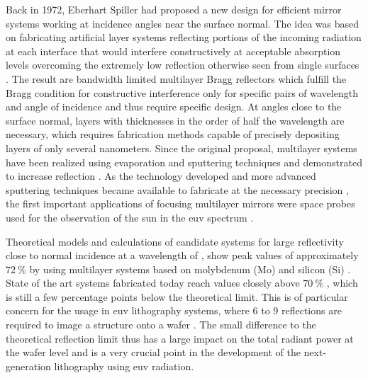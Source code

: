 Back in 1972, Eberhart Spiller had proposed a new design for efficient mirror systems working at incidence angles near the surface normal. The idea was based on fabricating artificial layer systems reflecting portions of the incoming radiation at each interface that would interfere constructively at acceptable absorption levels overcoming the extremely low reflection otherwise seen from single surfaces \cite{spiller_low-loss_1972}. The result are bandwidth limited multilayer Bragg reflectors which fulfill the Bragg condition for constructive interference only for specific pairs of wavelength and angle of incidence and thus require specific design. At angles close to the surface normal, layers with thicknesses in the order of half the wavelength are necessary, which requires fabrication methods capable of precisely depositing layers of only several nanometers. Since the original proposal, multilayer systems have been realized using evaporation and sputtering techniques and demonstrated to increase reflection \cite{spiller_reflective_1976, underwood_layered_1981}. As the technology developed and more advanced sputtering techniques became available to fabricate at the necessary precision \cite{stearns_fabrication_1991}, the first important applications of focusing multilayer mirrors were space probes used for the observation of the sun in the \gls{euv} spectrum \cite{chauvineau_description_1992, clette_eit:_1995, spiller_soft_1994}.

Theoretical models and calculations of candidate systems for large reflectivity close to normal incidence at a wavelength of , show peak values of approximately $\SI{72}{\percent}$ by using multilayer systems based on molybdenum (Mo) and silicon (Si) \cite{barbee_jr._multi-spectral_1991,finkenthal_near_1990, barbee_molybdenum-silicon_1985}. State of the art systems fabricated today reach values closely above $\SI{70}{\percent}$ \cite{martinez-galarce_high_2000,bajt_improved_2002,braun_grenzflachen-optimierte_2003, braun_mo/si_2002, feigl_euv_2006}, which is still a few percentage points below the theoretical limit. This is of particular concern for the usage in \gls{euv} lithography systems, where $6$ to $9$ reflections are required to image a structure onto a wafer \cite{kaiser_euvl_2008, wagner_euv_2010}. The small difference to the theoretical reflection limit thus has a large impact on the total radiant power at the wafer level and is a very crucial point in the development of the next-generation lithography using \gls{euv} radiation. 

